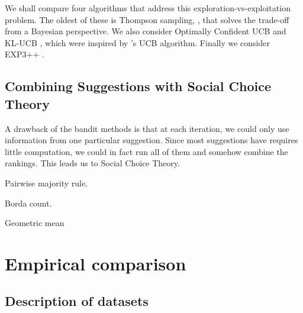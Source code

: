 \documentclass[fleqn,10pt,lineno]{wlpeerj} %
\begin{document}
We shall compare four algorithms that address this exploration-vs-exploitation
problem. The oldest of these is Thompson sampling, \citep{thompson33},
that solves the trade-off from a Bayesian
perspective. We also
consider Optimally Confident UCB \citep{lattimore15} and KL-UCB \citep{cappe13},
which were inspired by \citep{auer02}'s UCB algorithm. Finally we consider
EXP3++ \citep{seldin14}. 



\subsection*{Combining Suggestions with Social Choice Theory}

A drawback of the bandit methods is that at each iteration, we could only use
information from one particular suggestion. Since most suggestions have
requires little computation, we could in fact run all of them and somehow
combine the rankings. This leads us to Social Choice Theory.

Pairwise majority rule.

Borda count.

Geometric mean \cite{bedo14}


\section*{Empirical comparison}

\subsection*{Description of datasets}
\end{document}
